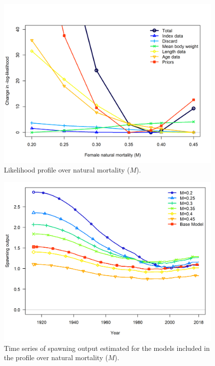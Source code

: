 \documentclass[12pt,]{article}
\begin{document}
\FloatBarrier

\begin{figure}
\centering
\includegraphics{Figures/profile_M.png}
\caption{Likelihood profile over natural mortality (\(M\)).
\label{fig:profile_M}}
\end{figure}

\begin{figure}
\centering
\includegraphics{Figures/profile_M_compare1_spawnbio.png}
\caption{Time series of spawning output estimated for the models
included in the profile over natural mortality (\(M\)).
\label{fig:profile_M_compare1_spawnbio}}
\end{figure}
\end{document}
